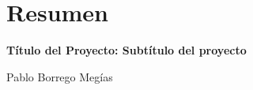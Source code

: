 \chapter{Resumen}

\begin{center}
    {\large\bfseries Título del Proyecto: Subtítulo del proyecto}\\
    \end{center}
    \begin{center}
    Pablo Borrego Megías \\
    \end{center}
